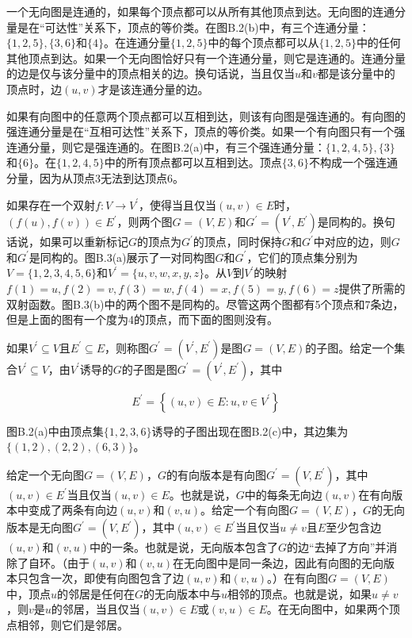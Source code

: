 \documentclass[lang=cn,newtx,10pt,scheme=chinese]{elegantbook}
\begin{document}
一个无向图是连通的，如果每个顶点都可以从所有其他顶点到达。无向图的连通分量是在“可达性”关系下，顶点的等价类。在图B.2(b)中，有三个连通分量：$\{1,2,5\},\{3,6\}$和$\{4\}$。在连通分量$\{1,2,5\}$中的每个顶点都可以从$\{1,2,5\}$中的任何其他顶点到达。如果一个无向图恰好只有一个连通分量，则它是连通的。连通分量的边是仅与该分量中的顶点相关的边。换句话说，当且仅当$u$和$v$都是该分量中的顶点时，边$(u,v)$才是该连通分量的边。

如果有向图中的任意两个顶点都可以互相到达，则该有向图是强连通的。有向图的强连通分量是在“互相可达性”关系下，顶点的等价类。如果一个有向图只有一个强连通分量，则它是强连通的。在图B.2(a)中，有三个强连通分量：$\{1,2,4,5\},\{3\}$和$\{6\}$。在$\{1,2,4,5\}$中的所有顶点都可以互相到达。顶点$\{3,6\}$不构成一个强连通分量，因为从顶点3无法到达顶点6。

如果存在一个双射$f:V\rightarrow V^{\prime}$，使得当且仅当$(u,v)\in E$时，$(f(u),f(v))\in E^{\prime}$，则两个图$G=(V,E)$和$G^{\prime}=\left(V^{\prime},E^{\prime}\right)$是同构的。换句话说，如果可以重新标记$G$的顶点为$G^{\prime}$的顶点，同时保持$G$和$G^{\prime}$中对应的边，则$G$和$G^{\prime}$是同构的。图B.3(a)展示了一对同构图$G$和$G^{\prime}$，它们的顶点集分别为$V=\{1,2,3,4,5,6\}$和$V^{\prime}=\{u,v,w,x,y,z\}$。从$V$到$V^{\prime}$的映射$f(1)=u,f(2)=v,f(3)=w,f(4)=x,f(5)=y,f(6)=z$提供了所需的双射函数。图B.3(b)中的两个图不是同构的。尽管这两个图都有5个顶点和7条边，但是上面的图有一个度为4的顶点，而下面的图则没有。

如果$V^{\prime}\subseteq V$且$E^{\prime}\subseteq E$，则称图$G^{\prime}=\left(V^{\prime},E^{\prime}\right)$是图$G=(V,E)$的子图。给定一个集合$V^{\prime}\subseteq V$，由$V^{\prime}$诱导的$G$的子图是图$G^{\prime}=\left(V^{\prime},E^{\prime}\right)$，其中

$$
E^{\prime}=\left\{(u, v) \in E: u, v \in V^{\prime}\right\}
$$

图B.2(a)中由顶点集$\{1,2,3,6\}$诱导的子图出现在图B.2(c)中，其边集为$\{(1,2),(2,2),(6,3)\}$。

给定一个无向图$G=(V,E)$，$G$的有向版本是有向图$G^{\prime}=\left(V,E^{\prime}\right)$，其中$(u,v)\in E^{\prime}$当且仅当$(u,v)\in E$。也就是说，$G$中的每条无向边$(u,v)$在有向版本中变成了两条有向边$(u,v)$和$(v,u)$。给定一个有向图$G=(V,E)$，$G$的无向版本是无向图$G^{\prime}=\left(V,E^{\prime}\right)$，其中$(u,v)\in E^{\prime}$当且仅当$u\neq v$且$E$至少包含边$(u,v)$和$(v,u)$中的一条。也就是说，无向版本包含了$G$的边“去掉了方向”并消除了自环。（由于$(u,v)$和$(v,u)$在无向图中是同一条边，因此有向图的无向版本只包含一次，即使有向图包含了边$(u,v)$和$(v,u)$。）在有向图$G=(V,E)$中，顶点$u$的邻居是任何在$G$的无向版本中与$u$相邻的顶点。也就是说，如果$u\neq v$，则$v$是$u$的邻居，当且仅当$(u,v)\in E$或$(v,u)\in E$。在无向图中，如果两个顶点相邻，则它们是邻居。
\end{document}
